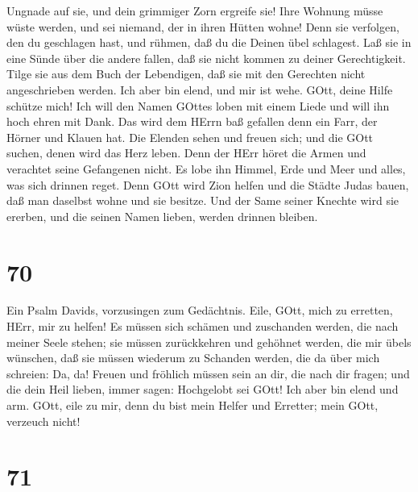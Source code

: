 Ungnade auf sie, und dein grimmiger Zorn ergreife sie! 
Ihre Wohnung müsse wüste werden, und sei niemand, der in ihren Hütten
wohne!  Denn sie verfolgen, den du geschlagen hast, und
rühmen, daß du die Deinen übel schlagest.  Laß sie in eine
Sünde über die andere fallen, daß sie nicht kommen zu deiner
Gerechtigkeit.  Tilge sie aus dem Buch der Lebendigen, daß
sie mit den Gerechten nicht angeschrieben werden.  Ich aber
bin elend, und mir ist wehe. GOtt, deine Hilfe schütze mich!
 Ich will den Namen GOttes loben mit einem Liede und will
ihn hoch ehren mit Dank.  Das wird dem HErrn baß gefallen
denn ein Farr, der Hörner und Klauen hat.  Die Elenden
sehen und freuen sich; und die GOtt suchen, denen wird das Herz leben.
 Denn der HErr höret die Armen und verachtet seine
Gefangenen nicht.  Es lobe ihn Himmel, Erde und Meer und
alles, was sich drinnen reget.  Denn GOtt wird Zion helfen
und die Städte Judas bauen, daß man daselbst wohne und sie besitze.
 Und der Same seiner Knechte wird sie ererben, und die
seinen Namen lieben, werden drinnen bleiben.

\hypertarget{section-69}{%
\section{70}\label{section-69}}

 Ein Psalm Davids, vorzusingen zum Gedächtnis. 
Eile, GOtt, mich zu erretten, HErr, mir zu helfen!  Es
müssen sich schämen und zuschanden werden, die nach meiner Seele stehen;
sie müssen zurückkehren und gehöhnet werden, die mir übels wünschen,
 daß sie müssen wiederum zu Schanden werden, die da über
mich schreien: Da, da!  Freuen und fröhlich müssen sein an
dir, die nach dir fragen; und die dein Heil lieben, immer sagen:
Hochgelobt sei GOtt!  Ich aber bin elend und arm. GOtt, eile
zu mir, denn du bist mein Helfer und Erretter; mein GOtt, verzeuch
nicht!

\hypertarget{section-70}{%
\section{71}\label{section-70}}

